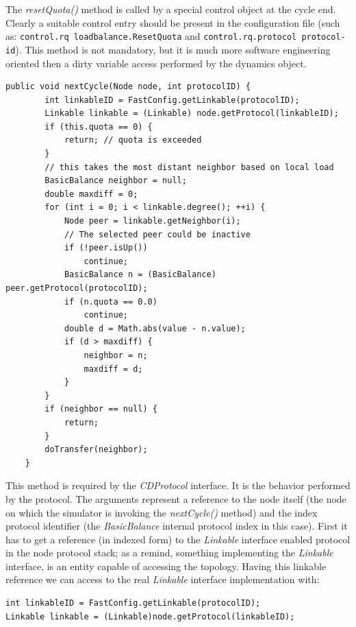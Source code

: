 \documentclass[a4paper,11pt]{article}
\begin{document}
The \emph{resetQuota()} method is called by a special control object at
the cycle end. Clearly a suitable control entry should be present
in the configuration file (such as: \texttt{control.rq loadbalance.ResetQuota}
and \texttt{control.rq.protocol protocol-id}). This method is not
mandatory, but it is much more software engineering oriented then a
dirty variable access performed by the dynamics object.

\footnotesize
\begin{verbatim}
public void nextCycle(Node node, int protocolID) {
        int linkableID = FastConfig.getLinkable(protocolID);
        Linkable linkable = (Linkable) node.getProtocol(linkableID);
        if (this.quota == 0) {
            return; // quota is exceeded
        }
        // this takes the most distant neighbor based on local load
        BasicBalance neighbor = null;
        double maxdiff = 0;
        for (int i = 0; i < linkable.degree(); ++i) {
            Node peer = linkable.getNeighbor(i);
            // The selected peer could be inactive
            if (!peer.isUp())
                continue;
            BasicBalance n = (BasicBalance) peer.getProtocol(protocolID);
            if (n.quota == 0.0)
                continue;
            double d = Math.abs(value - n.value);
            if (d > maxdiff) {
                neighbor = n;
                maxdiff = d;
            }
        }
        if (neighbor == null) {
            return;
        }
        doTransfer(neighbor);
    }
\end{verbatim}
\normalsize

This method is required by the \emph{CDProtocol} interface. It is the
behavior performed by the protocol. The arguments represent a reference
to the node itself (the node on which the simulator is invoking the
\emph{nextCycle()} method) and the index protocol identifier (the
\emph{BasicBalance} 
internal protocol index in this case). First it has to get a reference
(in indexed form) to 
the \emph{Linkable} interface enabled protocol in the node protocol
stack; as a remind, something implementing the \emph{Linkable} interface,
is an entity capable of accessing the topology. Having this linkable
reference we can access to the real \emph{Linkable} interface
implementation with: 

\begin{verbatim}
int linkableID = FastConfig.getLinkable(protocolID);
Linkable linkable = (Linkable)node.getProtocol(linkableID);
\end{verbatim}
\end{document}
